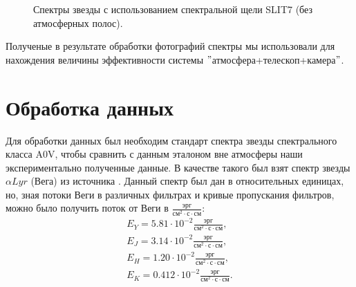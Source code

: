 \documentclass[a4paper]{article}
\begin{document}
\begin{figure}[h]
\begin{minipage}[h]{0.50\linewidth}
\end{minipage}
\begin{minipage}[h]{0.50\linewidth}
\end{minipage}
\caption{Спектры звезды с использованием спектральной щели SLIT7 (без атмосферных полос).}
\label{ris:image3}
\end{figure}

\hfill\break
Полученые в результате обработки фотографий спектры мы использовали для нахождения величины эффективности системы $"$атмосфера+телескоп+камера$"$.
\section{Обработка данных}
Для обработки данных был необходим стандарт спектра звезды спектрального класса A0V, чтобы сравнить с данным эталоном вне атмосферы наши экспериментально полученные данные. В качестве такого был взят спектр звезды $\alpha Lyr$ (Вега) из источника \cite{Vega}. Данный спектр был дан в относительных единицах, но, зная потоки Веги в различных фильтрах и кривые пропускания фильтров, можно было получить поток от Веги в $\frac{\text{эрг}}{\text{см}^2\cdot\text{с}\cdot\text{см}}$:
\begin{eqnarray*}
E_{Y} =  5.81\cdot10^{-2} \frac{\text{эрг}}{\text{см}^2\cdot\text{с}\cdot\text{см}},\\
E_{J} =  3.14\cdot10^{-2} \frac{\text{эрг}}{\text{см}^2\cdot\text{с}\cdot\text{см}},\\
E_{H} =  1.20\cdot10^{-2} \frac{\text{эрг}}{\text{см}^2\cdot\text{с}\cdot\text{см}},\\
E_{K} =  0.412\cdot10^{-2} \frac{\text{эрг}}{\text{см}^2\cdot\text{с}\cdot\text{см}}.\\
\end{eqnarray*}
\end{document}
